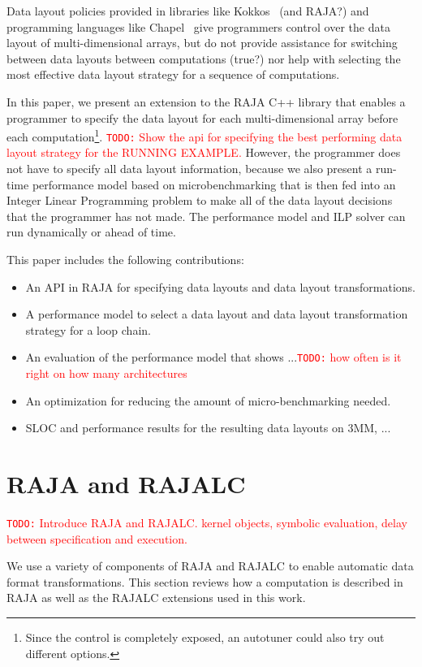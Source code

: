 \documentclass[sigconf, table]{acmart}
\newcommand{\todo}[1]{{\textcolor{red}{{\tt{TODO:}}\,\,#1 }}}
\begin{document}
Data layout policies provided in libraries like Kokkos~\cite{Kokkosdatalayout} (and RAJA?)
and programming languages like Chapel~\cite{Chapeldomainmappingpaper?} give
programmers control over the data layout of multi-dimensional arrays, but do not 
provide assistance for switching between data layouts between computations (true?) 
nor help with selecting the most effective data layout strategy for a sequence of computations.

In this paper, we present an extension to the RAJA C++ library that enables a programmer
to specify the data layout for each multi-dimensional array before each 
computation\footnote{Since the control is completely exposed, an autotuner could also try out different options.}.
\todo{Show the api for specifying the best performing data layout strategy
for the RUNNING EXAMPLE.}
However, the programmer does not have to specify all data layout information, because
we also present a run-time performance model based on microbenchmarking that is
then fed into an Integer Linear Programming problem to make all of the data layout decisions
that the programmer has not made.
The performance model and ILP solver can run dynamically or ahead of time.

This paper includes the following contributions:
\begin{itemize}
\item An API in RAJA for specifying data layouts and data layout transformations.
\item A performance model to select a data layout and data layout transformation strategy for 
         a loop chain.
\item An evaluation of the performance model that shows ...\todo{how often is it right on how many architectures}
\item An optimization for reducing the amount of micro-benchmarking needed.
\item SLOC and performance results for the resulting data layouts on 3MM, ...
\end{itemize} 


\section{RAJA and RAJALC}

\todo{Introduce RAJA and RAJALC. kernel objects, symbolic evaluation, delay between specification and execution.}

We use a variety of components of RAJA and RAJALC to enable automatic data format transformations. This section reviews how a computation is described in RAJA as well as the RAJALC extensions used in this work. 
\end{document}

